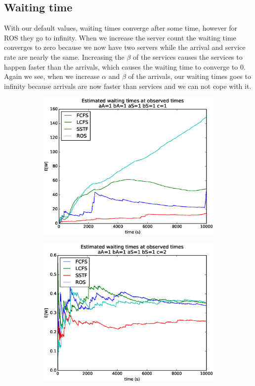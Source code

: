 \documentclass[a4paper]{article}
\begin{document}
\subsection{Waiting time}
With our default values, waiting times converge after some time, however for ROS they go to infinity.
When we increase the server count the waiting time converges to zero because we now have two servers while the arrival and service rate are nearly the same. Increasing the $\beta$ of the services causes the services to happen faster than the arrivals, which causes the waiting time to converge to 0. Again we see, when we increase $\alpha$ and $\beta$ of the arrivals, our waiting times goes to infinity because arrivals are now faster than services and we can not cope with it.
\begin{figure}[H]
\begin{subfigure}{.5\textwidth}
  \centering
  \includegraphics[width=\linewidth]{../figures/waiting_times11111}
  \label{fig:wt}
\end{subfigure}
\begin{subfigure}{.5\textwidth}
  \centering
  \includegraphics[width=\linewidth]{../figures/waiting_times11112}
  \label{fig:wta}
\end{subfigure}
\end{figure}
\end{document}
